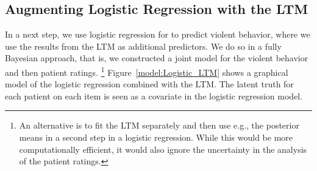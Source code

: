 \documentclass[a4paper,11pt]{article}
\begin{document}
\subsection{Augmenting Logistic Regression with the LTM}
In a next step, we use logistic regression for to predict violent behavior, where we use the results from the LTM as additional predictors.
We do so in a fully Bayesian approach, that is, we constructed a joint model for the violent behavior and then patient ratings.%
\footnote{%
An alternative is to fit the LTM separately and then use e.g., the posterior means in a second step in a logistic regression.
While this would be more computationally efficient, it would also ignore the uncertainty in the analysis of the patient ratings.
}
Figure~\ref{model:Logistic_LTM} shows a graphical model of the logistic regression combined with the LTM.
The latent truth for each patient on each item is seen as a covariate in the logistic regression model.

\end{document}
